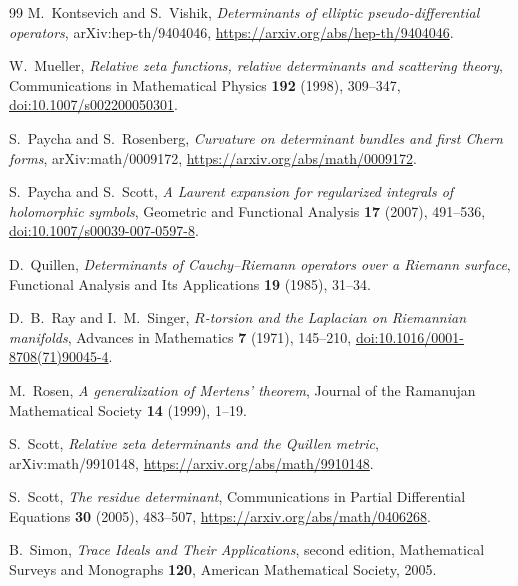 \documentclass[11pt]{article}
\theoremstyle{definition}
\theoremstyle{remark}
\begin{document}
\begin{thebibliography}{99}
M.~Kontsevich and S.~Vishik,
\emph{Determinants of elliptic pseudo-differential operators},
arXiv:hep-th/9404046,
\url{https://arxiv.org/abs/hep-th/9404046}.

W.~Mueller,
\emph{Relative zeta functions, relative determinants and scattering theory},
Communications in Mathematical Physics \textbf{192} (1998), 309--347,
\href{https://doi.org/10.1007/s002200050301}{doi:10.1007/s002200050301}.

S.~Paycha and S.~Rosenberg,
\emph{Curvature on determinant bundles and first Chern forms},
arXiv:math/0009172,
\url{https://arxiv.org/abs/math/0009172}.

S.~Paycha and S.~Scott,
\emph{A Laurent expansion for regularized integrals of holomorphic symbols},
Geometric and Functional Analysis \textbf{17} (2007), 491--536,
\href{https://doi.org/10.1007/s00039-007-0597-8}{doi:10.1007/s00039-007-0597-8}.

D.~Quillen,
\emph{Determinants of Cauchy--Riemann operators over a Riemann surface},
Functional Analysis and Its Applications \textbf{19} (1985), 31--34.

D.~B.~Ray and I.~M.~Singer,
\emph{$R$-torsion and the Laplacian on Riemannian manifolds},
Advances in Mathematics \textbf{7} (1971), 145--210,
\href{https://doi.org/10.1016/0001-8708(71)90045-4}{doi:10.1016/0001-8708(71)90045-4}.

M.~Rosen,
\emph{A generalization of Mertens' theorem},
Journal of the Ramanujan Mathematical Society \textbf{14} (1999), 1--19.

S.~Scott,
\emph{Relative zeta determinants and the Quillen metric},
arXiv:math/9910148,
\url{https://arxiv.org/abs/math/9910148}.

S.~Scott,
\emph{The residue determinant},
Communications in Partial Differential Equations \textbf{30} (2005), 483--507,
\url{https://arxiv.org/abs/math/0406268}.

B.~Simon,
\emph{Trace Ideals and Their Applications}, second edition,
Mathematical Surveys and Monographs \textbf{120}, American Mathematical Society, 2005.

\end{thebibliography}
\end{document}
